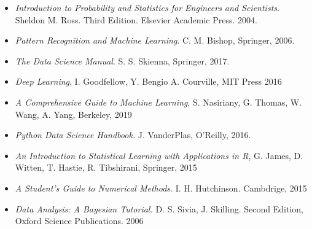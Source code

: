 \documentclass[letterpaper,10pt,onecolumn]{article}
\begin{document}
\begin{itemize}

\item 
\textit{Introduction to Probability and Statistics for Engineers and
  Scientists}. Sheldon M. Ross. Third Edition. Elsevier Academic
  Press. 2004.\\[-0.6cm]

\item
\textit{Pattern Recognition and Machine Learning}. C. M. Bishop, 
Springer, 2006.\\[-0.6cm]

\item 
\textit{The Data Science Manual}. S. S. Skienna, Springer, 2017.\\[-0.6cm]

\item
\textit{Deep Learning}, I. Goodfellow, Y. Bengio A. Courville, MIT Press 2016 \\[-0.6cm]

\item
\textit{A Comprehensive Guide to Machine Learning}, S. Nasiriany, G. Thomas, W. Wang, A. Yang, 
Berkeley, 2019 \\[-0.6cm]

\item
\textit{Python Data Science Handbook.} J. VanderPlas, O'Reilly, 2016.\\[-0.6cm]

\item 
\textit{An Introduction to Statistical Learning with Applications in
  R}, G. James, D. Witten, T. Hastie, R. Tibshirani, Springer, 2015 \\[-0.6cm]

\item 
\textit{A Student's Guide to Numerical  Methods}. I. H. Hutchinson. Cambdrige, 2015 \\[-0.6cm]

\item
\textit{Data Analysis: A Bayesian Tutorial.} D. S. Sivia,
J. Skilling. Second Edition, Oxford Science Publications. 2006 \\[-0.6cm]

\end{itemize}
\end{document}

